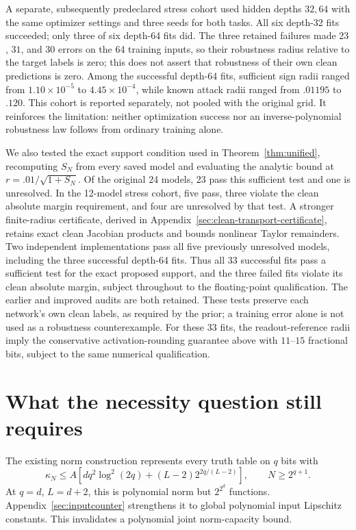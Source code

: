\documentclass[11pt]{article}
\begin{document}
A separate, subsequently predeclared stress cohort used hidden depths $32,64$
with the same optimizer settings and three seeds for both tasks. All six
depth-32 fits succeeded; only three of six depth-64 fits did. The three
retained failures made $23$, $31$, and $30$ errors on the 64 training inputs,
so their robustness radius relative to the target labels is zero; this does
not assert that robustness of their own clean predictions is zero.
Among the successful depth-64
fits, sufficient sign radii ranged from $1.10\times10^{-5}$ to
$4.45\times10^{-4}$, while known attack radii ranged from $.01195$ to $.120$.
This cohort is reported separately, not pooled with the original grid.
It reinforces the limitation: neither optimization success nor an
inverse-polynomial robustness law follows from ordinary training alone.

We also tested the exact support condition used in
Theorem~\ref{thm:unified}, recomputing $S_N$ from every saved model and
evaluating the analytic bound at $r=.01/\sqrt{1+S_N}$.
Of the original 24 models, 23 pass this sufficient test and one is unresolved.
In the 12-model stress cohort, five pass, three violate the clean absolute
margin requirement, and four are unresolved by that test. A stronger
finite-radius certificate, derived in Appendix~\ref{sec:clean-transport-certificate},
retains exact clean Jacobian products and bounds nonlinear Taylor remainders.
Two independent implementations pass all five previously unresolved models,
including the three successful depth-64 fits. Thus all 33 successful fits
pass a sufficient test for the exact proposed support, and the three failed
fits violate its clean absolute margin, subject throughout to the
floating-point qualification. The earlier and improved audits are both
retained. These tests preserve each network's own clean labels, as required
by the prior; a training error alone is not used as a robustness counterexample.
For these 33 fits, the readout-reference radii imply the conservative
activation-rounding guarantee above with $11$--$15$ fractional bits,
subject to the same numerical qualification.

\section{What the necessity question still requires}

The existing norm construction represents every truth table on $q$ bits with
\[
 \kappa_N\le A\left[dq^2\log^2(2q)+(L-2)2^{2q/(L-2)}\right],
 \qquad N\ge2^{q+1}.
\]
At $q=d$, $L=d+2$, this is polynomial norm but $2^{2^d}$ functions.
Appendix~\ref{sec:inputcounter} strengthens it to global polynomial input
Lipschitz constants. This invalidates a polynomial joint norm-capacity bound.
\end{document}
